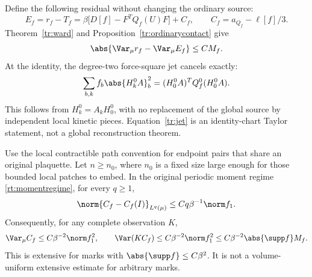 Define the following residual without changing the ordinary source:
\begin{equation}
 E_f=r_f-T_f
   =\beta\bigl[D[f]-F^TQ_f(U)F\bigr]+C_f,
 \qquad C_f=a_{Q_f}-\ell[f]/3.
 \label{tr:residual}
\end{equation}
Theorem~\ref{tr:ward} and Proposition~\ref{tr:ordinarycontact} give
\begin{equation}
 \abs{\Var_\mu r_f-\Var_\mu E_f}\le CM_f.
 \label{tr:fullcomparison}
\end{equation}
At the identity, the degree-two force-square jet cancels exactly:
\begin{equation}
 \sum_{b,k}f_b\abs{H_k^0A}_b^2
       =(H_0^0A)^TQ_f^0(H_0^0A).
 \label{tr:jet}
\end{equation}
This follows from \(H_k^0=A_kH_0^0\), with no replacement of the global
source by independent local kinetic pieces. Equation~\eqref{tr:jet} is
an identity-chart Taylor statement, not a global reconstruction theorem.

\begin{proposition}
\label{tr:contactremainder}
Use the local contractible path convention for endpoint pairs that share an
original plaquette. Let \(n\ge n_0\), where \(n_0\) is a fixed size large
enough for those bounded local patches to embed. In the original periodic
moment regime \eqref{rt:momentregime}, for every \(q\ge1\),
\begin{equation}
 \norm{C_f-C_f(I)}_{L^q(\mu)}
     \le Cq\beta^{-1}\norm f_1.
 \label{tr:contactLp}
\end{equation}
Consequently, for any complete observation \(K\),
\begin{equation}
 \Var_\mu C_f\le C\beta^{-2}\norm f_1^2,
 \qquad
 \Var(KC_f)\le C\beta^{-2}\norm f_1^2
       \le C\beta^{-2}\abs{\supp f}M_f.
 \label{tr:contactvariance}
\end{equation}
This is extensive for marks with \(\abs{\supp f}\le C\beta^2\). It is not
a volume-uniform extensive estimate for arbitrary marks.
\end{proposition}

